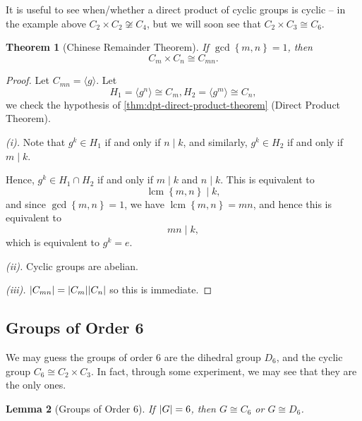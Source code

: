 \documentclass{article}
\newtheorem{theorem}{Theorem}[section]
\newtheorem{lemma}[theorem]{Lemma}
\theoremstyle{definition}
\theoremstyle{remark}
\DeclarePairedDelimiter{\abs}{\lvert}{\rvert}
\newcommand{\Bqty}[1]{\left\{#1\right\}}
\newcommand{\angBrac}[1]{\langle #1\rangle}
\newcommand{\isomorphic}{\cong}
\newcommand{\divides}{\mid}
\newcommand{\lcm}{\operatorname{lcm}}
\newcommand{\notisomorphic}{\not\cong}
\begin{document}
It is useful to see when/whether a direct product of cyclic groups is cyclic -- in the example above \(C_2 \times C_2 \notisomorphic C_4\), but we will soon see that \(C_2 \times C_3 \isomorphic C_6\).

\begin{theorem}[Chinese Remainder Theorem]
    \label{thm:crt-chinese-remainder-theorem}%
    If \(\gcd\Bqty{m, n} = 1\), then
    \[
        C_m \times C_n \isomorphic C_{mn}.
    \]
\end{theorem}

\begin{proof}
    Let \(C_{mn} = \angBrac{g}\). Let
    \[
        H_1 = \angBrac{g^n} \isomorphic C_m, H_2 = \angBrac{g^m} \isomorphic C_n,
    \]
    we check the hypothesis of \autoref{thm:dpt-direct-product-theorem} (Direct Product Theorem).

    \emph{(i).} Note that \(g^k \in H_1\) if and only if \(n \divides k\), and similarly, \(g^k \in H_2\) if and only if \(m \divides k\).

    Hence, \(g^k \in H_1 \cap H_2\) if and only if \(m \divides k\) and \(n \divides k\). This is equivalent to
    \[
        \lcm\Bqty{m, n} \divides k,
    \]
    and since \(\gcd\Bqty{m, n} = 1\), we have \(\lcm\Bqty{m, n} = mn\), and hence this is equivalent to
    \[
        mn \divides k,
    \]
    which is equivalent to \(g^k = e\).

    \emph{(ii).} Cyclic groups are abelian.

    \emph{(iii).} \(\abs{C_{mn}} = \abs{C_m} \abs{C_n}\) so this is immediate.
\end{proof}

\subsection{Groups of Order 6}
\label{sec:groups-of-order-6}

We may guess the groups of order \(6\) are the dihedral group \(D_6\), and the cyclic group \(C_6 \isomorphic C_2 \times C_3\). In fact, through some experiment, we may see that they are the only ones.

\begin{lemma}[Groups of Order 6]
    \label{lem:groups-of-order-6}%
    If \(\abs{G} = 6\), then \(G \isomorphic C_6\) or \(G \isomorphic D_6\).
\end{lemma}
\end{document}
